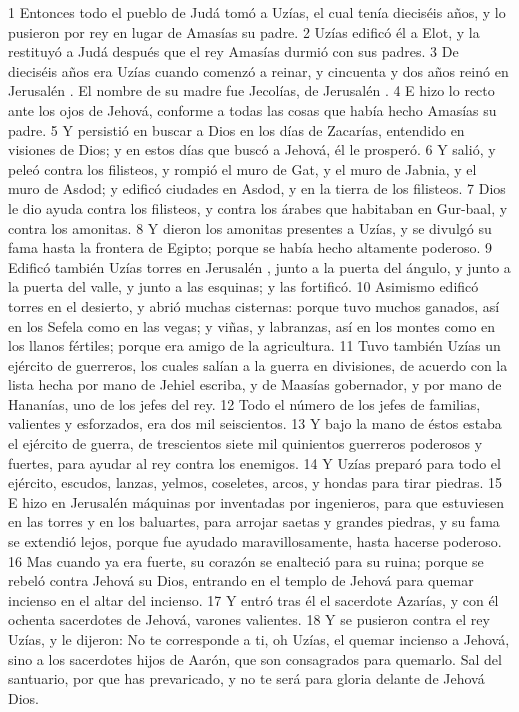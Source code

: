 1 Entonces todo el pueblo de Judá tomó a Uzías, el cual tenía dieciséis años, y lo pusieron por rey en lugar de Amasías su padre.
2 Uzías edificó él a Elot, y la restituyó a Judá después que el rey Amasías durmió con sus padres.
3 De dieciséis años era Uzías cuando comenzó a reinar, y cincuenta y dos años reinó en Jerusalén . El nombre de su madre fue Jecolías, de Jerusalén .
4 E hizo lo recto ante los ojos de Jehová, conforme a todas las cosas que había hecho Amasías su padre.
5 Y persistió en buscar a Dios en los días de Zacarías, entendido en visiones de Dios; y en estos días que buscó a Jehová, él le prosperó.
6 Y salió, y peleó contra los filisteos, y rompió el muro de Gat, y el muro de Jabnia, y el muro de Asdod; y edificó ciudades en Asdod, y en la tierra de los filisteos.
7 Dios le dio ayuda contra los filisteos, y contra los árabes que habitaban en Gur-baal, y contra los amonitas.
8 Y dieron los amonitas presentes a Uzías, y se divulgó su fama hasta la frontera de Egipto; porque se había hecho altamente poderoso.
9 Edificó también Uzías torres en Jerusalén , junto a la puerta del ángulo, y junto a la puerta del valle, y junto a las esquinas; y las fortificó.
10 Asimismo edificó torres en el desierto, y abrió muchas cisternas: porque tuvo muchos ganados, así en los Sefela como en las vegas; y viñas, y labranzas, así en los montes como en los llanos fértiles; porque era amigo de la agricultura.
11 Tuvo también Uzías un ejército de guerreros, los cuales salían a la guerra en divisiones, de acuerdo con la lista hecha por mano de Jehiel escriba, y de Maasías gobernador, y por mano de Hananías, uno de los jefes del rey.
12 Todo el número de los jefes de familias, valientes y esforzados, era dos mil seiscientos.
13 Y bajo la mano de éstos estaba el ejército de guerra, de trescientos siete mil quinientos guerreros poderosos y fuertes, para ayudar al rey contra los enemigos.
14 Y Uzías preparó para todo el ejército, escudos, lanzas, yelmos, coseletes, arcos, y hondas para tirar piedras.
15 E hizo en Jerusalén  máquinas por inventadas por ingenieros, para que estuviesen en las torres y en los baluartes, para arrojar saetas y grandes piedras, y su fama se extendió lejos, porque fue ayudado maravillosamente, hasta hacerse poderoso.
16 Mas cuando ya era fuerte, su corazón se enalteció para su ruina; porque se rebeló contra Jehová su Dios, entrando en el templo de Jehová para quemar incienso en el altar del incienso.
17 Y entró tras él el sacerdote Azarías, y con él ochenta sacerdotes de Jehová, varones valientes.
18 Y se pusieron contra el rey Uzías, y le dijeron: No te corresponde a ti, oh Uzías, el quemar incienso a Jehová, sino a los sacerdotes hijos de Aarón, que son consagrados para quemarlo. Sal del santuario, por que has prevaricado, y no te será para gloria delante de Jehová Dios.
